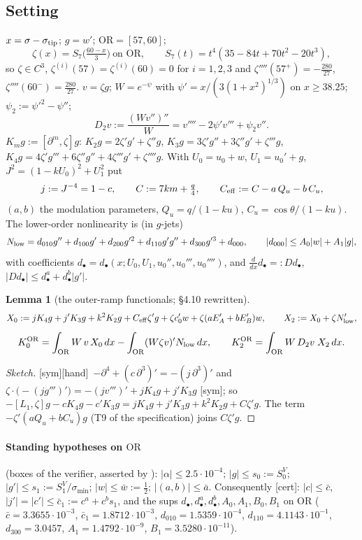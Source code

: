 \documentclass[11pt]{article}
\newtheorem{lemma}{Lemma}\newtheorem{proposition}{Proposition}\newtheorem{remark}{Remark}\newtheorem{definition}{Definition}
\newcommand{\fn}[1]{\texttt{\detokenize{#1}}}
\newcommand{\tC}{\textup{[cert]}}\newcommand{\tHd}{\textup{[hand]}}\newcommand{\tE}{\textup{[est]}}\newcommand{\tS}{\textup{[sym]}}
\newcommand{\OR}{\mathrm{OR}}\newcommand{\eI}{\varepsilon_I}
\begin{document}
\subsection{Setting}\label{F:sec:set}
$x=\sigma-\sigma_{\rm tip}$; $g=w'$; $\OR=[57,60]$;
\[\zeta(x)=S_7\bigl(\tfrac{60-x}3\bigr)\ \text{on }\OR,\qquad S_7(t)=t^4(35-84t+70t^2-20t^3),\]
so $\zeta\in C^3$, $\zeta^{(i)}(57)=\zeta^{(i)}(60)=0$ for $i=1,2,3$ and $\zeta''''(57^+)=-\frac{280}{27}$, $\zeta''''(60^-)=\frac{280}{27}$. $v=\zeta g$; $W=e^{-\psi}$ with $\psi'=x/(3(1+x^2)^{1/3})$ on $x\ge38.25$; $\psi_2:=\psi'^2-\psi''$;
\[D_2v:=\frac{(Wv'')''}{W}=v''''-2\psi'v'''+\psi_2v''.\]
$K_mg:=[\partial^m,\zeta]g$: $K_2g=2\zeta'g'+\zeta''g$, $K_3g=3\zeta'g''+3\zeta''g'+\zeta'''g$, $K_4g=4\zeta'g'''+6\zeta''g''+4\zeta'''g'+\zeta''''g$.
With $U_0=u_0+w$, $U_1=u_0'+g$, $J^2=(1-kU_0)^2+U_1^2$ put
\[j:=J^{-4}=1-c,\qquad C:=7km+\tfrac q4,\qquad C_{\rm eff}:=C-a\,Q_u-b\,C_u ,\]
$(a,b)$ the modulation parameters, $Q_u=q/(1-ku)$, $C_u=\cos\theta/(1-ku)$. The lower-order nonlinearity is (in $g$-jets)
\[N_{\rm low}=d_{010}g''+d_{100}g'+d_{200}g'^2+d_{110}g'g''+d_{300}g'^3+d_{000},\qquad|d_{000}|\le A_0|w|+A_1|g| ,\]
with coefficients $d_\bullet=d_\bullet(x;U_0,U_1,u_0'',u_0''',u_0'''')$, and $\frac d{dx}d_\bullet=:Dd_\bullet$, $|Dd_\bullet|\le d_\bullet^a+d_\bullet^b|g'|$.

\begin{lemma}[the outer-ramp functionals; \fn{EI_SPEC.md} \S4.10 rewritten]\label{F:lem:def}
\[X_0:=jK_4g+j'K_3g+k^2K_2g+C_{\rm eff}\zeta'g+\zeta c_0'w+\zeta(aE_A'+bE_B')w,\qquad X_2:=X_0+\zeta N_{\rm low}' ,\]
\[K_0^{\OR}=\int_{\OR}W\,v\,X_0\,dx-\int_{\OR}(W\zeta v)'N_{\rm low}\,dx,\qquad K_2^{\OR}=\int_{\OR}W\,D_2v\;X_2\,dx .\]
\end{lemma}
\begin{proof}[Sketch]\tS\tHd\ $-\partial^4+(c\,\partial^3)'=-(j\,\partial^3)'$ and $\zeta\cdot\bigl(-(jg''')'\bigr)=-(jv''')'+jK_4g+j'K_3g$ \tS; so $-[L_1,\zeta]g-cK_4g-c'K_3g=jK_4g+j'K_3g+k^2K_2g+C\zeta'g$. The term $-\zeta'(aQ_u+bC_u)g$ (T9 of the specification) joins $C\zeta'g$.
\end{proof}

\paragraph{Standing hypotheses on $\OR$} (boxes of the verifier, asserted by \fn{closure.box_assert}): $|\alpha|\le2.5\cdot10^{-4}$; $|g|\le s_0:=S^V_0$; $|g'|\le s_1:=S^V_1/\sigma_{\min}$; $|w|\le\bar w:=\frac12$; $|(a,b)|\le\bar a$. Consequently \tC: $|c|\le\bar c$, $|j'|=|c'|\le\bar c_1:=c^a+c^bs_1$, and the sups $d_\bullet,d^a_\bullet,d^b_\bullet,A_0,A_1,B_0,B_1$ on $\OR$ ($\bar c=3.3655\cdot10^{-3}$, $\bar c_1=1.8712\cdot10^{-3}$, $d_{010}=1.5359\cdot10^{-4}$, $d_{110}=4.1143\cdot10^{-1}$, $d_{300}=3.0457$, $A_1=1.4792\cdot10^{-9}$, $B_1=3.5280\cdot10^{-11}$).
\end{document}
